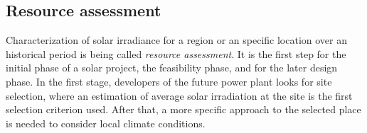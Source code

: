

\subsection{Resource assessment}

Characterization of solar irradiance for a region or an specific location over an historical period is being called \textit{resource assessment}. It is the first step for the initial phase of a solar project, the feasibility phase, and for the later design phase. In the first stage, developers of the future power plant looks for site selection, where an estimation of average solar irradiation at the site is the first selection criterion used. After that, a more specific approach to the selected place is needed to consider local climate conditions.

